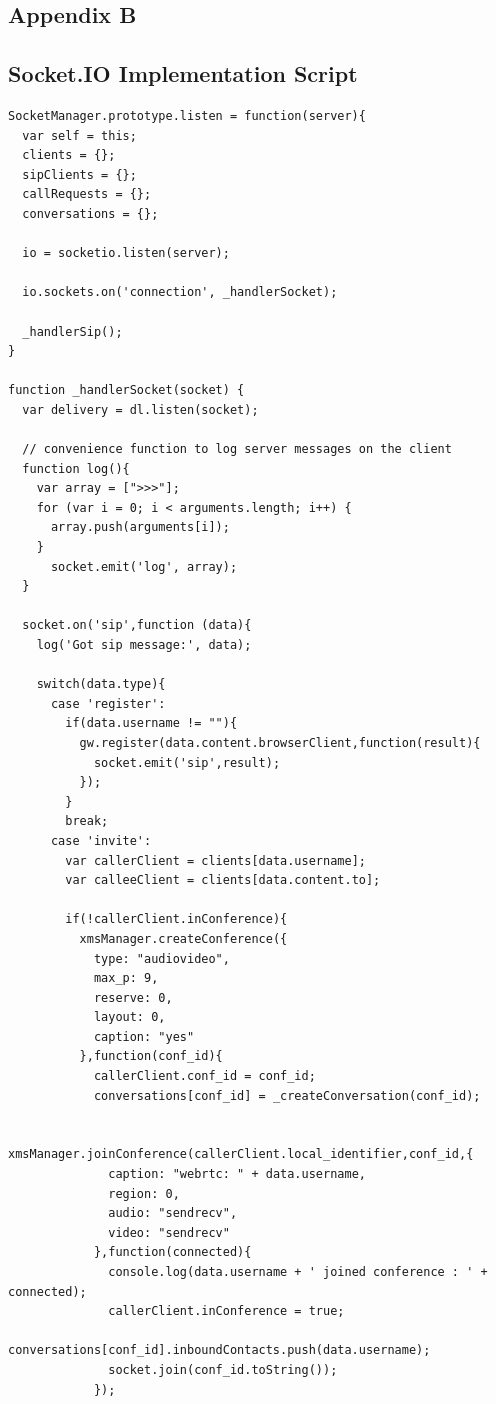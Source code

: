 \begin{appendices}
\chapter{Appendix B}

\section{Socket.IO Implementation Script} 
\label{server:socket}

\begin{lstlisting}[caption={socket.js on Application Server},label={code:server_socket}]
SocketManager.prototype.listen = function(server){
  var self = this;
  clients = {};
  sipClients = {};
  callRequests = {};
  conversations = {};

  io = socketio.listen(server);

  io.sockets.on('connection', _handlerSocket);

  _handlerSip();
}

function _handlerSocket(socket) {
  var delivery = dl.listen(socket);

  // convenience function to log server messages on the client
  function log(){
    var array = [">>>"];
    for (var i = 0; i < arguments.length; i++) {
      array.push(arguments[i]);
    }
      socket.emit('log', array);
  }

  socket.on('sip',function (data){
    log('Got sip message:', data);

    switch(data.type){
      case 'register':
        if(data.username != ""){
          gw.register(data.content.browserClient,function(result){
            socket.emit('sip',result);
          });
        }
        break;
      case 'invite':
        var callerClient = clients[data.username];
        var calleeClient = clients[data.content.to];

        if(!callerClient.inConference){
          xmsManager.createConference({
            type: "audiovideo",
            max_p: 9,
            reserve: 0,
            layout: 0,
            caption: "yes"
          },function(conf_id){
            callerClient.conf_id = conf_id;
            conversations[conf_id] = _createConversation(conf_id);

            xmsManager.joinConference(callerClient.local_identifier,conf_id,{
              caption: "webrtc: " + data.username,
              region: 0,
              audio: "sendrecv",
              video: "sendrecv"
            },function(connected){
              console.log(data.username + ' joined conference : ' + connected);
              callerClient.inConference = true;
              conversations[conf_id].inboundContacts.push(data.username);
              socket.join(conf_id.toString());
            });


\end{lstlisting}
\end{appendices}
